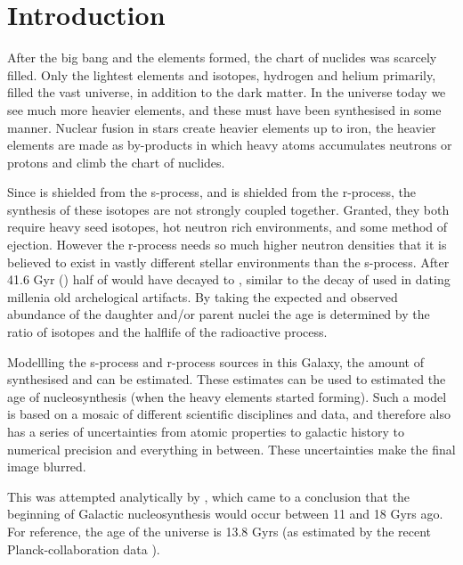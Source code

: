 \chapter{Introduction}
\label{sec:introduction}

After the big bang and the elements formed, the chart of nuclides was scarcely filled.
Only the lightest elements and isotopes, hydrogen and helium primarily, filled the vast universe\cite{alphabetagamma}, in addition to the dark matter.
In the universe today we see much more heavier elements, and these must have been synthesised in some manner.
Nuclear fusion in stars create heavier elements up to iron, the heavier elements are made as by-products in which heavy atoms accumulates neutrons or protons and climb the chart of nuclides\cite{BBFH}.

Since  is shielded from the s-process, and  is shielded from the r-process, the synthesis of these isotopes are not
strongly coupled together. Granted, they both require heavy seed isotopes, hot neutron rich environments, and some method of ejection.
However the r-process needs so much higher neutron densities that it is believed to exist in vastly different stellar environments than the s-process.
After 41.6 Gyr () half of  would have decayed to , similar to the decay of  used in dating millenia old archelogical artifacts.
By taking the expected and observed abundance of the daughter and/or parent nuclei the age is determined by the ratio of isotopes and the halflife of the radioactive process.

Modellling the s-process and r-process sources in this Galaxy, the amount of synthesised  and  can be estimated.
These estimates can be used to estimated the age of nucleosynthesis (when the heavy elements started forming).
Such a model is based on a mosaic of different scientific disciplines and data, and therefore also has a series of uncertainties from atomic properties to galactic history to numerical precision and everything in between.
These uncertainties make the final image blurred.

This was attempted analytically by , which came to a conclusion that the beginning of Galactic nucleosynthesis would occur between 11 and 18 Gyrs ago.
For reference, the age of the universe is 13.8 Gyrs (as estimated by the recent Planck-collaboration data ).

